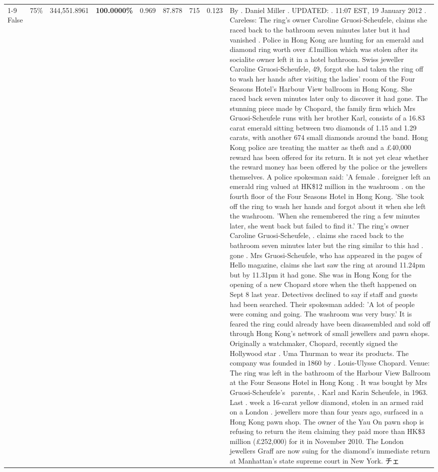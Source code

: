 \begin{table}[H]
\begin{tabular}{lllrlllll}
\cline{1-9} \cline{2-9}
False & 75\% & 344,551.8961 & \bfseries \color{red} 100.0000\% & 0.969 & 87.878 & 715 & 0.123 & By . Daniel Miller . UPDATED: . 11:07 EST, 19 January 2012 . Careless: The ring's owner Caroline Gruosi-Scheufele, claims she raced back to the bathroom seven minutes later but it had vanished . Police in Hong Kong are hunting for an emerald and diamond ring worth over £1million which was stolen after its socialite owner left it in a hotel bathroom. Swiss jeweller Caroline Gruosi-Scheufele, 49, forgot she had taken the ring off to wash her hands after visiting the ladies' room of the Four Seasons Hotel's Harbour View ballroom in Hong Kong. She raced back seven minutes later only to discover it had gone. The stunning piece made by Chopard, the family firm which Mrs Gruosi-Scheufele runs with her brother Karl, consists of a 16.83 carat emerald sitting between two diamonds of 1.15 and 1.29 carats, with another 674 small diamonds around the band. Hong Kong police are treating the matter as theft and a £40,000 reward has been offered for its return. It is not yet clear whether the reward money has been offered by the police or the jewellers themselves. A police spokesman said: 'A female . foreigner left an emerald ring valued at HK\$12 million in the washroom . on the fourth floor of the Four Seasons Hotel in Hong Kong. 'She took off the ring to wash her hands and forgot about it when she left the washroom. 'When she remembered the ring a few minutes later, she went back but failed to find it.' The ring's owner Caroline Gruosi-Scheufele, . claims she raced back to the bathroom seven minutes later but the ring similar to this had . gone . Mrs Gruosi-Scheufele, who has appeared in the pages of Hello magazine, claims she last saw the ring at around 11.24pm but by 11.31pm it had gone. She was in Hong Kong for the opening of a new Chopard store when the theft happened on Sept 8 last year. Detectives declined to say if staff and guests had been searched. Their spokesman added: 'A lot of people were coming and going. The washroom was very busy.' It is feared the ring could already have been disassembled and sold off through Hong Kong's network of small jewellers and pawn shops. Originally a watchmaker, Chopard, recently signed the Hollywood star . Uma Thurman to wear its products. The company was founded in 1860 by . Louis-Ulysse Chopard. Venue: The ring was left in the bathroom of the Harbour View Ballroom at the Four Seasons Hotel in Hong Kong . It was bought by Mrs Gruosi-Scheufele's  parents, . Karl and Karin Scheufele, in 1963. Last . week a 16-carat yellow diamond, stolen in an armed raid on a London . jewellers more than four years ago, surfaced in a Hong Kong pawn shop. The owner of the Yau On pawn shop is refusing to return the item claiming they paid more than HK\$3 million (£252,000) for it in November 2010. The London jewellers Graff are now suing for the diamond’s immediate return at Manhattan’s state supreme court in New York. チェ \\

\end{tabular}
\end{table}
